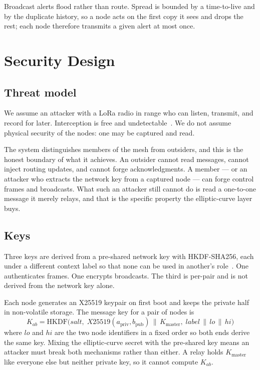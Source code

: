 \documentclass[conference]{IEEEtran}
\begin{document}
Broadcast alerts flood rather than route. Spread is bounded by a time-to-live and
by the duplicate history, so a node acts on the first copy it sees and drops the
rest; each node therefore transmits a given alert at most once.

\section{Security Design}\label{sec:security}

\subsection{Threat model}

We assume an attacker with a LoRa radio in range who can listen, transmit, and
record for later. Interception is free and undetectable~\cite{aras2017exploring}.
We do not assume physical security of the nodes: one may be captured and read.

The system distinguishes members of the mesh from outsiders, and this is the
honest boundary of what it achieves. An outsider cannot read messages, cannot
inject routing updates, and cannot forge acknowledgments. A member — or an
attacker who extracts the network key from a captured node — can forge control
frames and broadcasts. What such an attacker still cannot do is read a one-to-one
message it merely relays, and that is the specific property the elliptic-curve
layer buys.

\subsection{Keys}

Three keys are derived from a pre-shared network key with HKDF-SHA256, each under
a different context label so that none can be used in another's
role~\cite{rfc5869}. One authenticates frames. One encrypts broadcasts. The third
is per-pair and is not derived from the network key alone.

Each node generates an X25519 keypair on first boot and keeps the private half in
non-volatile storage. The message key for a pair of nodes is
\[
K_{ab} = \mathrm{HKDF}\bigl(\mathit{salt},\;
  X25519(a_{\text{priv}}, b_{\text{pub}}) \,\|\, K_{\text{master}},\;
  \mathit{label} \,\|\, \mathit{lo} \,\|\, \mathit{hi}\bigr)
\]
where $\mathit{lo}$ and $\mathit{hi}$ are the two node identifiers in a fixed
order so both ends derive the same key. Mixing the elliptic-curve secret with the
pre-shared key means an attacker must break both mechanisms rather than either.
A relay holds $K_{\text{master}}$ like everyone else but neither private key, so
it cannot compute $K_{ab}$.
\end{document}
